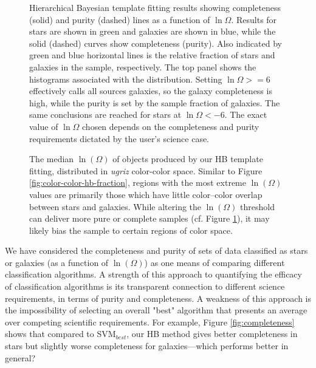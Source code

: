 \documentclass[12pt,preprint]{aastex}
\begin{document}
\begin{figure}
\centering
\caption{Hierarchical Bayesian template fitting results showing
  completeness (solid) and purity (dashed) lines as a function of
  $\ln\Omega$.  Results for stars are shown in green and galaxies are
  shown in blue, while the solid (dashed) curves show completeness
  (purity).  Also indicated by green and blue horizontal lines is the
  relative fraction of stars and galaxies in the sample, respectively.
  The top panel shows the histograms associated with the
  distribution. Setting $\ln\Omega>=6$ effectively calls all sources
  galaxies, so the galaxy completeness is high, while the purity is
  set by the sample fraction of galaxies.  The same conclusions are
  reached for stars at $\ln\Omega<-6$.  The exact value of $\ln\Omega$
  chosen depends on the completeness and purity requirements dictated
  by the user's science case.}
\label{fig:hb-logodds}
\end{figure}



\begin{figure}
\centering
\caption{The median $\ln(\Omega)$ of objects produced by our HB
  template fitting, distributed in {\it ugriz} color-color space.
  Similar to Figure \ref{fig:color-color-hb-fraction}, regions with
  the most extreme $\ln(\Omega)$ values are primarily those which have
  little color--color overlap between stars and galaxies.  While
  altering the $\ln(\Omega)$ threshold can deliver more pure or
  complete samples (cf. Figure \ref{fig:hb-logodds}), it may likely
  bias the sample to certain regions of color space.}
\label{fig:color-color-hb-odds}
\end{figure}


We have considered the completeness and purity of
sets of data classified as stars or galaxies (as a function of $\ln(\Omega)$) as one means of comparing different classification algorithms.  A strength of this approach to quantifying the efficacy of classification algorithms is its transparent connection to different science requirements, in terms of purity and completeness.  A weakness of this approach is the impossibility of selecting an overall "best" algorithm that presents an average over competing scientific requirements.
For example, Figure \ref{fig:completeness} shows that compared to
SVM$_{best}$, our HB method gives better completeness in stars but
slightly worse completeness for galaxies---which performs better in
general?
\end{document}
